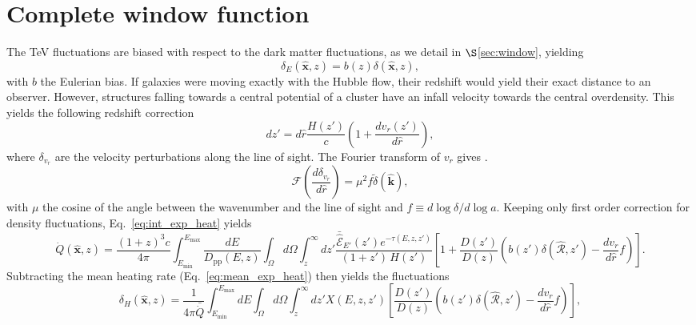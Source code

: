 \documentclass[numberedappendix]{emulateapj}
\begin{document}
\section{Complete window function}
\label{sec:window_complete}
The TeV fluctuations are biased with respect to the dark matter fluctuations, as we detail in $\S$\ref{sec:window}, yielding
\begin{equation}
\delta_E(\mathbf{\hat{x}},z)=b(z)\delta(\mathbf{\hat{x}},z),
\label{eq:bias}
\end{equation}
with $b$ the Eulerian bias. If galaxies were moving exactly with the Hubble flow, their redshift would yield their exact distance to an observer. However, structures falling towards a central potential of a cluster have an infall velocity towards the central overdensity. This yields the following redshift correction
\begin{equation}
\label{eq:vel_perturb}
dz'=d\hat r\frac{H(z')}{c}\left(1+\frac{dv_r(z')}{d\hat r}\right),
\end{equation}
where $\delta_{v_r}$ are the velocity perturbations along the line of sight. The Fourier transform of $v_r$ gives \citep{1987MNRAS.227....1K}.
\begin{equation}
\label{eq:kaiser2}
\mathcal{F}\left(\frac{d\delta_{v_r}}{d\hat r}\right)=\mu^2 f \tilde{\delta}(\mathbf{\hat k}),
\end{equation}
with $\mu$ the cosine of the angle between the wavenumber and the line of sight and $f\equiv d\log\delta/d\log a$. Keeping only first order correction for density fluctuations, Eq.~\eqref{eq:int_exp_heat} yields
\begin{equation}
\label{eq:mean_heat0}
\dot{Q}(\mathbf{\hat{x}},z)=\frac{(1+z)^3c}{4\pi }\int_{E_{\mathrm{min}}}^{E_{\mathrm{max}}}\frac{dE}{D_{\mathrm{pp}}(E,z)}\int_{\Omega}d\Omega\int_z^{\infty} dz'\frac{\mathcal{\bar{\hat E}}_{E'}(z')e^{-\tau(E,z,z')}}{(1+z')\,H(z')}\left[1+\frac{D(z')}{D(z)}\left(b(z')\delta(\mathbf{\hat{\mathcal{R}}}, z') -\frac{dv_r}{d\hat r}f\right)\right].
\end{equation}
Subtracting the mean heating rate (Eq.~\eqref{eq:mean_exp_heat}) then yields the fluctuations
\begin{equation}
\label{eq:heat_fluc0}
\delta_H(\mathbf{\hat{x}}, z)=\frac{1}{4\pi\bar{\dot{Q}}}\int_{E_{\mathrm{min}}}^{E_{\mathrm{max}}} dE\int_{\Omega}d\Omega\int_z^{\infty}dz'X(E,z,z')\left[\frac{D(z')}{D(z)}\left(b(z')\delta(\mathbf{\hat{\mathcal{R}}}, z') -\frac{dv_r}{d\hat r}f\right)\right],
\end{equation}
\end{document}
